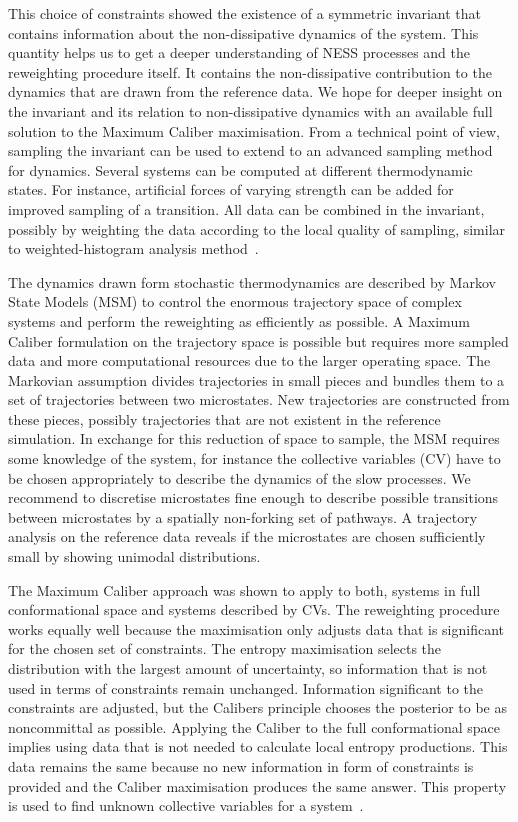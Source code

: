 This choice of constraints showed the existence of a symmetric invariant that contains information about the non-dissipative dynamics of the system. This quantity helps us to get a deeper understanding of NESS processes and the reweighting procedure itself. It contains the non-dissipative contribution to the dynamics that are drawn from the reference data.  We hope for deeper insight on the invariant and its relation to non-dissipative dynamics with an available full solution to the Maximum Caliber maximisation. From a technical point of view, sampling the invariant can be used to extend to an advanced sampling method for dynamics. Several systems can be computed at different thermodynamic states. For instance, artificial forces of varying strength can be added for improved sampling of a transition. All data can be combined in the invariant, possibly by weighting the data according to the local quality  of sampling, similar to weighted-histogram analysis method~\cite{kumar1995multidimensional}. 

The dynamics drawn form stochastic thermodynamics are described by Markov State Models (MSM) to control the enormous trajectory space of complex systems and perform the reweighting as efficiently as possible. A Maximum Caliber formulation on the trajectory space is possible but requires more sampled data and more computational resources due to the larger operating space. The Markovian assumption divides trajectories in small pieces and bundles them to a set of trajectories between two microstates. New trajectories are constructed from these pieces, possibly trajectories that are not existent in the reference simulation. In exchange for this reduction of space to sample, the MSM requires some knowledge of the system, for instance the collective variables (CV) have to be chosen appropriately to describe the dynamics of the slow processes. We recommend to discretise microstates fine enough to describe possible transitions between microstates by a spatially non-forking set of pathways. A trajectory analysis on the reference data reveals if the microstates are chosen sufficiently small by showing unimodal distributions. 

The Maximum Caliber approach was shown to apply to both, systems in full conformational space and systems described by CVs. The reweighting procedure works equally well because the maximisation only adjusts data that is significant for the chosen set of constraints. The entropy maximisation selects the distribution with the largest amount of uncertainty, so information that is not used in terms of constraints remain unchanged. Information significant to the constraints are adjusted, but the Calibers principle chooses the posterior to be as noncommittal as possible. Applying the Caliber to the full conformational space implies using data that is not needed to calculate local entropy productions. This data remains the same because no new information in form of constraints is provided and the Caliber maximisation produces the same answer. This property is used to find unknown collective variables for a system~\cite{smith2018multi, tiwary2016spectral}. 


